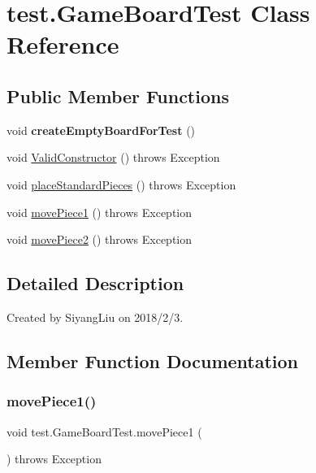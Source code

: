 \hypertarget{classtest_1_1_game_board_test}{}\section{test.\+Game\+Board\+Test Class Reference}
\label{classtest_1_1_game_board_test}
\subsection*{Public Member Functions}
\begin{DoxyCompactItemize}
\item 
\mbox{\label{classtest_1_1_game_board_test_a57003188298acb6a4f21436c6cb7feaf}} 
void {\bfseries create\+Empty\+Board\+For\+Test} ()
\item 
void \mbox{\hyperlink{classtest_1_1_game_board_test_a45e7ff57d223c2ebb209cc35f8b0d916}{Valid\+Constructor}} ()  throws Exception 
\item 
void \mbox{\hyperlink{classtest_1_1_game_board_test_ae0458820f080e86163d12ff75d019f9a}{place\+Standard\+Pieces}} ()  throws Exception 
\item 
void \mbox{\hyperlink{classtest_1_1_game_board_test_abcac1900d5c33b34015c93f1862a915f}{move\+Piece1}} ()  throws Exception 
\item 
void \mbox{\hyperlink{classtest_1_1_game_board_test_acac01404dbfc189519f2e21f4105d7e2}{move\+Piece2}} ()  throws Exception 
\end{DoxyCompactItemize}


\subsection{Detailed Description}
Created by Siyang\+Liu on 2018/2/3. 

\subsection{Member Function Documentation}
\mbox{\label{classtest_1_1_game_board_test_abcac1900d5c33b34015c93f1862a915f}} 
\subsubsection{\texorpdfstring{move\+Piece1()}{movePiece1()}}
{\footnotesize\ttfamily void test.\+Game\+Board\+Test.\+move\+Piece1 (\begin{DoxyParamCaption}{ }\end{DoxyParamCaption}) throws Exception}

